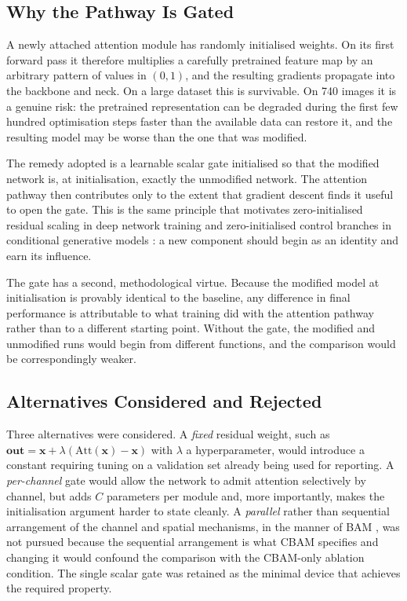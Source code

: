 \documentclass[MScCS]{uccthesis}
\begin{document}
\subsection{Why the Pathway Is Gated}

A newly attached attention module has randomly initialised weights. On its
first forward pass it therefore multiplies a carefully pretrained feature map
by an arbitrary pattern of values in $(0,1)$, and the resulting gradients
propagate into the backbone and neck. On a large dataset this is survivable.
On 740 images it is a genuine risk: the pretrained representation can be
degraded during the first few hundred optimisation steps faster than the
available data can restore it, and the resulting model may be worse than the
one that was modified.

The remedy adopted is a learnable scalar gate initialised so that the modified
network is, at initialisation, exactly the unmodified network. The attention
pathway then contributes only to the extent that gradient descent finds it
useful to open the gate. This is the same principle that motivates
zero-initialised residual scaling in deep network training
\parencite{bhojanapalli2021zeroinit} and zero-initialised control branches in
conditional generative models \parencite{zhang2023addingcontrol}: a new
component should begin as an identity and earn its influence.

The gate has a second, methodological virtue. Because the modified model at
initialisation is provably identical to the baseline, any difference in final
performance is attributable to what training did with the attention pathway
rather than to a different starting point. Without the gate, the modified and
unmodified runs would begin from different functions, and the comparison would
be correspondingly weaker.

\subsection{Alternatives Considered and Rejected}

Three alternatives were considered. A \emph{fixed} residual weight, such as
$\mathbf{out} = \mathbf{x} + \lambda(\mathrm{Att}(\mathbf{x}) - \mathbf{x})$
with $\lambda$ a hyperparameter, would introduce a constant requiring tuning on
a validation set already being used for reporting. A \emph{per-channel} gate
would allow the network to admit attention selectively by channel, but adds
$C$ parameters per module and, more importantly, makes the initialisation
argument harder to state cleanly. A \emph{parallel} rather than sequential
arrangement of the channel and spatial mechanisms, in the manner of BAM
\parencite{park2018bam}, was not pursued because the sequential arrangement is
what CBAM specifies and changing it would confound the comparison with the
CBAM-only ablation condition. The single scalar gate was retained as the
minimal device that achieves the required property.
\end{document}

